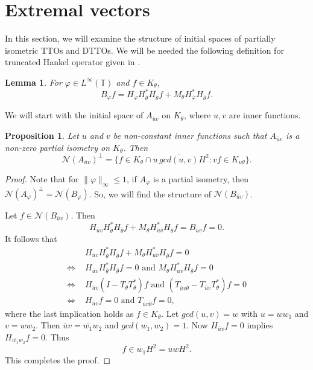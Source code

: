 \documentclass[12pt]{amsart}
\newcommand{\cln}{\mathcal{N}}
\newcommand{\T}{\mathbb{T}}
\newcommand{\h}{{H}^2}
\theoremstyle{definition}
\theoremstyle{plain}
\newtheorem{lem}[thm]{Lemma}
\newtheorem{prop}[thm]{Proposition}
\theoremstyle{definition}
\numberwithin{equation}{section}
\let\phi=\varphi
\begin{document}
	
	



\section{Extremal vectors}\label{sec4}
	
In this section, we will examine the structure of initial spaces of partially isometric TTOs and DTTOs. We will be needed the following definition for truncated Hankel operator given in \cite{PM}.
	
\begin{lem}
For $\phi \in L^\infty(\T)$ and $f \in K_\theta$,
\[
B_\phi f=H_\phi H_{\bar{\theta}}^*H_{\bar{\theta}}f+M_\theta H_{\bar{\phi}}^*H_{\bar{\theta}}f.
\]
\end{lem}
	
We will start with the initial space of $A_{\bar{u}v}$ on $K_\theta$, where $u,v$ are inner functions.
	

\begin{prop}
Let $u$ and $v$ be non-constant inner functions such that $A_{\bar{u}v}$ is a non-zero partial isometry on $K_\theta$. Then
\[
\cln(A_{\bar{u}v})^\perp=\{f \in K_\theta \cap u\, \overline{gcd(u,v)}\h: vf \in K_{u\theta}\}.
\]
\end{prop}
	


\begin{proof}
Note that for $\|\phi\|_{\infty} \leq 1$, if $A_\phi$ is a partial isometry, then 
$\cln(A_\phi)^\perp=\cln(B_\phi)$. So, we will find the structure of $\cln(B_{\bar{u}v})$.

Let $f \in \cln(B_{\bar{u}v})$. Then
\[
H_{\bar{u}v}H_{\bar{\theta}}^*H_{\bar{\theta}}f+ M_\theta H_{u\bar{v}}^*H_{\bar{\theta}}f = B_{\bar{u}v}f=0.
\]
It follows that
\begin{align*}
 & H_{\bar{u}v}H_{\bar{\theta}}^*H_{\bar{\theta}}f+M_\theta H_{u\bar{v}}^*H_{\bar{\theta}}f  =0\\
			\Leftrightarrow \,\,	& H_{\bar{u}v}H_{\bar{\theta}}^*H_{\bar{\theta}}f=0 \text{ and } M_\theta H_{u\bar{v}}^*H_{\bar{\theta}}f =0\\
			\Leftrightarrow \,\,& H_{\bar{u}v} (I-T_\theta T_\theta^*) f \text{ and } (T_{\bar{u}v\bar{\theta}}- T_{\bar{u}v}T_\theta^*)f=0\\
			\Leftrightarrow \,\,& H_{\bar{u}v}f=0 \text{ and } T_{\bar{u}v\bar{\theta}}f=0,
\end{align*}
where the last implication holds as $f \in K_\theta$. Let $gcd(u,v)=w$ with $u=ww_1$ and $v=ww_2$. Then $\bar{u}v=\bar{w_1}w_2$ and $gcd(w_1,w_2)=1$. Now $H_{\bar{u}v}f=0$ implies $H_{\bar{w_1}w_2}f=0$. Thus 
\[
f \in w_1\h=uw\h.
\]
This completes the proof.
\end{proof}
	
\end{document}
